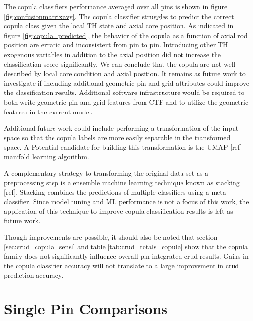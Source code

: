 The copula classifiers performance averaged over all pins is shown in figure \ref{fig:confusionmatrixavg}. The copula classifier struggles to predict the correct copula class given the local TH state and axial core position.  As indicated in figure \ref{fig:copula_predicted}, the behavior of the copula as a function of axial rod position are erratic and inconsistent from pin to pin.  Introducing other TH exogenous variables in addition to the axial position did not increase the classification score significantly.  We can conclude that the copula are not well described by local core condition and axial position.  It remains as future work to investigate if including additional geometric pin and grid attributes could improve the classification results.  Additional software infrastructure would be required to both write geometric pin and grid features from CTF and to utilize the geometric features in the current model.

Additional future work could include performing a transformation of the input space so that the copula labels are more easily separable in the transformed space.  A Potential candidate for building this transformation is the UMAP [ref] manifold learning algorithm.  

A complementary strategy to transforming the original data set as a preprocessing step is a ensemble machine learning technique known as stacking [ref].  Stacking combines the predictions of multiple classifiers using a meta-classifier.  Since model tuning and ML performance is not a focus of this work, the application of this technique to improve copula classification results is left as future work.  

Though improvements are possible, it should also be noted that section \ref{sec:crud_copula_sensi} and table \ref{tab:crud_totals_copula} show that the copula family does not significantly influence overall pin integrated crud results.  Gains in the copula classifier accuracy will not translate to a large improvement in crud prediction accuracy.

\section{Single Pin Comparisons}


